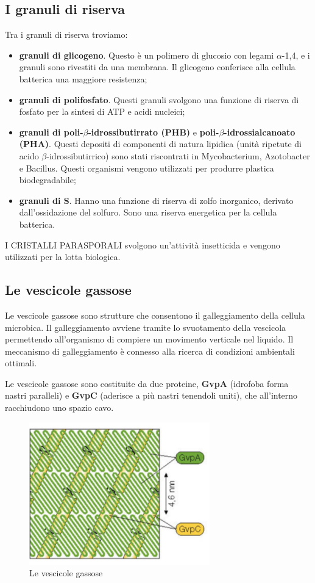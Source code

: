 \documentclass[11pt]{book}
\begin{document}
\subsection{I granuli di riserva}
Tra i granuli di riserva troviamo:
\begin{itemize}
\item \textbf{granuli di glicogeno}. Questo è un polimero di glucosio con legami $\alpha$-1,4, e i granuli sono rivestiti da una membrana.
Il glicogeno conferisce alla cellula batterica una maggiore resistenza;
\item \textbf{granuli di polifosfato}. Questi granuli svolgono una funzione di riserva di fosfato per la sintesi di ATP e acidi nucleici;
\item \textbf{granuli di poli-$\beta$-idrossibutirrato (PHB)} e \textbf{poli-$\beta$-idrossialcanoato (PHA)}. Questi depositi di componenti di natura lipidica (unità ripetute di acido $\beta$-idrossibutirrico) sono stati riscontrati in Mycobacterium, Azotobacter e Bacillus. Questi organismi vengono utilizzati per produrre plastica biodegradabile;
\item \textbf{granuli di S}. Hanno una funzione di riserva di zolfo inorganico, derivato dall’ossidazione del solfuro. Sono una riserva energetica per la cellula batterica.
\end{itemize}

I CRISTALLI PARASPORALI svolgono un'attività insetticida e vengono utilizzati per la lotta biologica.

\subsection{Le vescicole gassose}

Le vescicole gassose sono strutture che consentono il galleggiamento della cellula microbica. Il galleggiamento avviene tramite lo svuotamento della vescicola permettendo all'organismo di compiere un movimento verticale nel liquido. Il meccanismo di galleggiamento è connesso alla ricerca di condizioni ambientali ottimali.

\vspace{1em}
Le vescicole gassose sono costituite da due proteine, \textbf{GvpA} (idrofoba forma nastri paralleli) e \textbf{GvpC} (aderisce a più nastri tenendoli uniti), che all’interno racchiudono uno spazio cavo.

\begin{figure}[htp]
\centering
\includegraphics[scale=0.6]{img/Vescicole gassose.png}
\caption{Le vescicole gassose}
\label{}
\end{figure}
\end{document}
